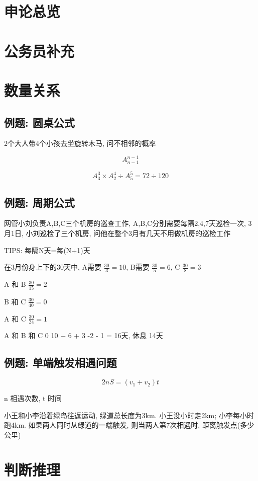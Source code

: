 \documentclass[UTF8]{ctexart}
\begin{document}
\section{申论总览}

\section{公务员补充}

\section{数量关系}

\subsection{例题: 圆桌公式}
2个大人带4个小孩去坐旋转木马, 问不相邻的概率

$$
	A^{n-1}_{n-1}
$$

$$
	A^{3}_{3} \times A^{4}_{2} \div A^{5}_{5} = 72 \div 120
$$

\subsection{例题: 周期公式}
网管小刘负责A,B,C三个机房的巡查工作, A,B,C分别需要每隔2,4,7天巡检一次, 3月1日, 小刘巡检了三个机房, 问他在整个3月有几天不用做机房的巡检工作

TIPS: 每隔N天=每(N+1)天

在3月份身上下的30天中, A需要  $\frac{30}{3} = 10$, B需要 $\frac{30}{5} = 6$, C $\frac{30}{8} = 3$

A 和 B $\frac{30}{15} = 2$

B 和 C $\frac{30}{40} = 0$

A 和 C $\frac{30}{24} = 1$

A 和 B 和 C 0
10 + 6 + 3 -2 - 1 = 16天, 休息 14天


\subsection{例题: 单端触发相遇问题}

$$
	2nS = (v_1 + v_2) t
$$

n 相遇次数, t 时间

小王和小李沿着绿岛往返运动, 绿道总长度为3km. 小王没小时走2km; 小李每小时跑4km. 如果两人同时从绿道的一端触发, 则当两人第7次相遇时, 距离触发点(多少公里)

\section{判断推理}
\end{document}
